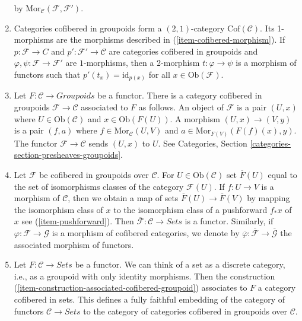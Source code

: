 \begin{remarks}
\begin{enumerate}
by $\text{Mor}_{\mathcal{C}}(\mathcal{F}, \mathcal{F}')$.
\item 
\label{item-definition-cofibered-groupoids-2-category}
Categories cofibered in groupoids form a $(2, 1)$-category 
$\text{Cof}(\mathcal{C})$. Its 1-morphisms are the morphisms described in 
(\ref{item-cofibered-morphism}). If $p: \mathcal{F} \to C$ and 
$p': \mathcal{F}' \to \mathcal{C}$ are categories cofibered in groupoids 
and $\varphi, \psi: \mathcal{F} \to \mathcal{F}'$ are $1$-morphisms, then 
a 2-morphism $t: \varphi \to \psi$ is a morphism of functors such that 
$p'(t_x) = \text{id}_{p(x)}$ for all $x \in \text{Ob}(\mathcal{F})$.
\item
\label{item-construction-associated-cofibered-groupoid} 
Let $F : \mathcal{C} \to \textit{Groupoids}$ be a functor. There 
is a category cofibered in groupoids $\mathcal{F} \to \mathcal{C}$ 
associated to $F$ as follows. An object of $\mathcal{F}$ is a pair $(U, x)$ 
where $U \in \text{Ob}(\mathcal{C})$ and $x \in \text{Ob}(F(U))$. A 
morphism $(U,x) \to (V,y)$ is a pair $(f, a)$ where
$f \in \text{Mor}_{\mathcal{C}}(U,V)$ and
$a \in \text{Mor}_{F(V)}(F(f)(x),y)$.
The functor $\mathcal{F} \to \mathcal{C}$ sends $(U, x)$ to $U$. See
Categories, Section \ref{categories-section-presheaves-groupoids}.
\item Let $\mathcal{F}$ be cofibered in groupoids over $\mathcal{C}$.
For $U \in \text{Ob}(\mathcal{C})$ set $\overline{F}(U)$ equal to
the set of isomorphisms classes of the category $\mathcal{F}(U)$.
If $f : U \to V$ is a morphism of $\mathcal{C}$, then we obtain a
map of sets $\overline{F}(U) \to \overline{F}(V)$ by mapping the
isomorphism class of $x$ to the isomorphism class of a pushforward
$f_*x$ of $x$ see (\ref{item-pushforward}). Then
$\overline{\mathcal{F}} : \mathcal{C} \to \textit{Sets}$ is a
functor. Similarly, if $\varphi: \mathcal{F} \to \mathcal{G}$ is a
morphism of cofibered categories, we denote by
$\overline{\varphi}: \overline{\mathcal{F}} \to  \overline{\mathcal{G}}$
the associated morphism of functors.
\item 
\label{item-convention-cofibered-sets}
Let $F: \mathcal{C} \to \textit{Sets}$ be a functor. We can think of a
set as a discrete category, i.e., as a groupoid with only identity morphisms.
Then the construction (\ref{item-construction-associated-cofibered-groupoid})
associates to $F$ a category cofibered in sets. This defines a fully
faithful embedding of the category of functors $\mathcal{C} \to \textit{Sets}$
to the category of categories cofibered in groupoids over $\mathcal{C}$.

\end{enumerate}
\end{remarks}
